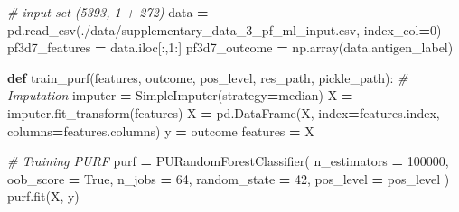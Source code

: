 \documentclass[
  11pt,
  oneside]{book}
\newenvironment{Shaded}{\begin{snugshade}}{\end{snugshade}}
\newcommand{\CommentTok}[1]{\textcolor[rgb]{0.56,0.35,0.01}{\textit{#1}}}
\newcommand{\DecValTok}[1]{\textcolor[rgb]{0.00,0.00,0.81}{#1}}
\newcommand{\KeywordTok}[1]{\textcolor[rgb]{0.13,0.29,0.53}{\textbf{#1}}}
\newcommand{\NormalTok}[1]{#1}
\newcommand{\OperatorTok}[1]{\textcolor[rgb]{0.81,0.36,0.00}{\textbf{#1}}}
\newcommand{\StringTok}[1]{\textcolor[rgb]{0.31,0.60,0.02}{#1}}
\newcommand{\VariableTok}[1]{\textcolor[rgb]{0.00,0.00,0.00}{#1}}
\begin{document}
\begin{Shaded}
\begin{Highlighting}[]
\CommentTok{\# input set (5393, 1 + 272)}
\NormalTok{data }\OperatorTok{=}\NormalTok{ pd.read\_csv(}\StringTok{\textquotesingle{}./data/supplementary\_data\_3\_pf\_ml\_input.csv\textquotesingle{}}\NormalTok{, index\_col}\OperatorTok{=}\DecValTok{0}\NormalTok{)}
\NormalTok{pf3d7\_features }\OperatorTok{=}\NormalTok{ data.iloc[:,}\DecValTok{1}\NormalTok{:]}
\NormalTok{pf3d7\_outcome }\OperatorTok{=}\NormalTok{ np.array(data.antigen\_label)}
\end{Highlighting}
\end{Shaded}

\begin{Shaded}
\begin{Highlighting}[]
\KeywordTok{def}\NormalTok{ train\_purf(features, outcome, pos\_level, res\_path, pickle\_path):}
    \CommentTok{\# Imputation}
\NormalTok{    imputer }\OperatorTok{=}\NormalTok{ SimpleImputer(strategy}\OperatorTok{=}\StringTok{\textquotesingle{}median\textquotesingle{}}\NormalTok{)}
\NormalTok{    X }\OperatorTok{=}\NormalTok{ imputer.fit\_transform(features)}
\NormalTok{    X }\OperatorTok{=}\NormalTok{ pd.DataFrame(X, index}\OperatorTok{=}\NormalTok{features.index, columns}\OperatorTok{=}\NormalTok{features.columns)}
\NormalTok{    y }\OperatorTok{=}\NormalTok{ outcome}
\NormalTok{    features }\OperatorTok{=}\NormalTok{ X}

    \CommentTok{\# Training PURF}
\NormalTok{    purf }\OperatorTok{=}\NormalTok{ PURandomForestClassifier(}
\NormalTok{        n\_estimators }\OperatorTok{=} \DecValTok{100000}\NormalTok{,}
\NormalTok{        oob\_score }\OperatorTok{=} \VariableTok{True}\NormalTok{,}
\NormalTok{        n\_jobs }\OperatorTok{=} \DecValTok{64}\NormalTok{,}
\NormalTok{        random\_state }\OperatorTok{=} \DecValTok{42}\NormalTok{,}
\NormalTok{        pos\_level }\OperatorTok{=}\NormalTok{ pos\_level}
\NormalTok{    )}
\NormalTok{    purf.fit(X, y)}


\end{Highlighting}
\end{Shaded}
\end{document}
